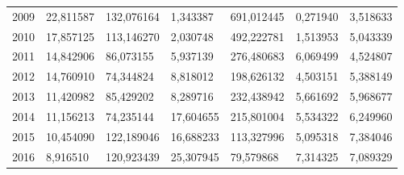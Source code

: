 \begin{table}
\begin{tabular}{p{1cm}p{2cm}p{2cm}p{2cm}p{2cm}p{2cm}p{2cm}}
 2009 &                              22,811587 & 132,076164 &                   1,343387 &                        691,012445 &                         0,271940 &                                           3,518633 \\
 2010 &                              17,857125 & 113,146270 &                   2,030748 &                        492,222781 &                         1,513953 &                                           5,043339 \\
 2011 &                              14,842906 &  86,073155 &                   5,937139 &                        276,480683 &                         6,069499 &                                           4,524807 \\
 2012 &                              14,760910 &  74,344824 &                   8,818012 &                        198,626132 &                         4,503151 &                                           5,388149 \\
 2013 &                              11,420982 &  85,429202 &                   8,289716 &                        232,438942 &                         5,661692 &                                           5,968677 \\
 2014 &                              11,156213 &  74,235144 &                  17,604655 &                        215,801004 &                         5,534322 &                                           6,249960 \\
 2015 &                              10,454090 & 122,189046 &                  16,688233 &                        113,327996 &                         5,095318 &                                           7,384046 \\
 2016 &                               8,916510 & 120,923439 &                  25,307945 &                         79,579868 &                         7,314325 &                                           7,089329 \\
\bottomrule
\end{tabular}
\end{table}
